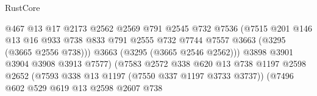 \begin{lexlean}{RustCore}
\begin{coremodule}
                                            @467
                                            @13
                                            @17
                                            @2173
                                            @2562
                                            @2569
                                            @791
                                            @2545
                                            @732
                                            @7536
                                            (@7515
                                              @201
                                              @146
                                              @13
                                              @16
                                              @933
                                              @738
                                              @833
                                              @791
                                              @2555
                                              @732
                                              @7744
                                              @7557
                                              @3663
                                              (@3295 (@3665 @2556 @738)))
                                            @3663
                                            (@3295 (@3665 @2546 @2562)))
                                          @3898
                                          @3901
                                          @3904
                                          @3908
                                          @3913
                                          @7577)
                                        (@7583
                                          @2572
                                          @338
                                          @620
                                          @13
                                          @738
                                          @1197
                                          @2598
                                          @2652
                                          (@7593 @338 @13 @1197 (@7550 @337 @1197 @3733 @3737))
                                          (@7496
                                            @602
                                            @529
                                            @619
                                            @13
                                            @2598
                                            @2607
                                            @738

\end{coremodule}
\end{lexlean}
